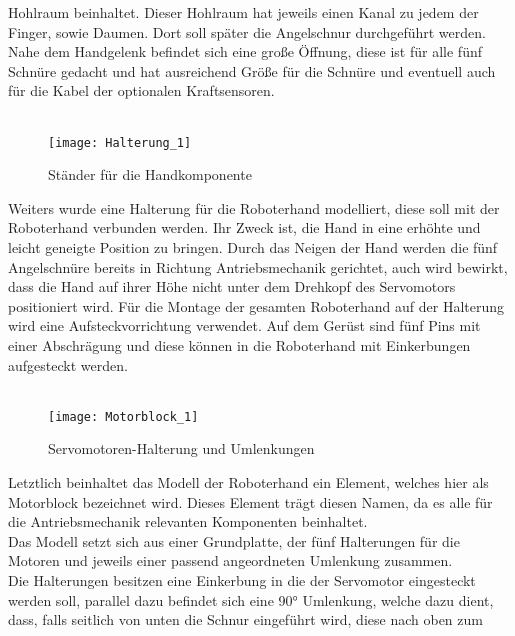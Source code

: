 \documentclass[titlepage,12pt,twoside]{article}
\begin{document}
Hohlraum beinhaltet. Dieser Hohlraum hat jeweils einen Kanal zu jedem der Finger, 
sowie Daumen. Dort soll später die Angelschnur durchgeführt werden. Nahe dem 
Handgelenk befindet sich eine große Öffnung, diese ist für alle fünf Schnüre 
gedacht und hat ausreichend Größe für die Schnüre und eventuell auch für die Kabel der 
optionalen Kraftsensoren. \\
\\
\begin{figure}[H]
	\begin{center}
		\scalebox{0.8}
		{\texttt{[image: Halterung\_1]}}
		\caption{Ständer für die Handkomponente}
		\label{fig:Halterung_1}		
	\end{center}
\end{figure}
\hfill \break
Weiters wurde eine Halterung für die Roboterhand modelliert, diese soll mit 
der Roboterhand verbunden werden. Ihr Zweck ist, die Hand in eine erhöhte und 
leicht geneigte Position zu bringen. Durch das Neigen der Hand werden die fünf 
Angelschnüre bereits in Richtung Antriebsmechanik gerichtet, auch wird bewirkt, 
dass die Hand auf ihrer Höhe nicht unter dem Drehkopf des Servomotors positioniert 
wird. Für die Montage der gesamten Roboterhand auf der Halterung wird eine 
Aufsteckvorrichtung verwendet. Auf dem Gerüst sind fünf Pins mit einer 
Abschrägung und diese können in die Roboterhand mit Einkerbungen aufgesteckt 
werden. \\
\\
\begin{figure}[H]
	\begin{center}
		\scalebox{0.8}
		{\texttt{[image: Motorblock\_1]}}
		\caption{Servomotoren-Halterung und Umlenkungen}
		\label{fig:Motorblock_1}			
	\end{center}
\end{figure}
\hfill \break
Letztlich beinhaltet das Modell der Roboterhand ein Element, welches hier als 
Motorblock bezeichnet wird. Dieses Element trägt diesen Namen, da es alle 
für die Antriebsmechanik relevanten Komponenten beinhaltet. \\
Das Modell setzt sich aus einer Grundplatte, der fünf Halterungen für die 
Motoren und jeweils einer passend angeordneten Umlenkung zusammen. \\
Die Halterungen besitzen eine Einkerbung in die der Servomotor eingesteckt 
werden soll, parallel dazu befindet sich eine 90° Umlenkung, welche dazu dient, 
dass, falls seitlich von unten die Schnur eingeführt wird, diese nach oben zum 
\end{document}
